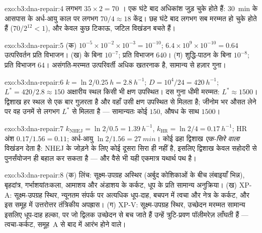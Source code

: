 \begin{solution}{exo:b3:dna-repair:4}
लगभग $35\times 2 = 70$ । एक घंटे बाद अधिकांश जुड़ चुके
होते हैं: \qty{30}{min} के आसपास के अर्ध-आयु काल पर लगभग $70/4 \approx 18$
केंद्र। छह घंटे बाद लगभग सब मरम्मत हो चुके होते हैं ($70/2^{12} < 1$),
और केवल कुछ टिकाऊ, जटिल विखंडन बचते हैं।
\end{solution}

\begin{solution}{exo:b3:dna-repair:5}
(क) $10^{-5}\times 10^{-2}\times 10^{-3} = 10^{-10}$; $6.4\times
10^{9}\times 10^{-10} = 0.64$ उत्परिवर्तन प्रति विभाजन। (ख)  के बिना $10^{-7}$; प्रति विभाजन $640$। (ग) शुद्धि-पाठन के बिना
$10^{-8}$; प्रति विभाजन $64$। असंगति-मरम्मत उत्परिवर्ती अधिक खतरनाक
है, सामान्य से हज़ार गुना।
\end{solution}

\begin{solution}{exo:b3:dna-repair:6}
$k = \ln 2/\qty{0.25}{h} = \qty{2.8}{h^{-1}}$; $D = 10^{4}/24 =
\qty{420}{h^{-1}}$; $L^{*} = 420/2.8 \approx 150$ अक्षारीय स्थल किसी भी
क्षण उपस्थित। दस गुना धीमी मरम्मत: $L^{*} \approx \num{1500}$।
द्विशाख हर स्थल से एक बार गुज़रता है और वहाँ उसी क्षण उपस्थित
 से मिलता है; जीनोम भर औसत लेने पर वह उनमें से लगभग $L^{*}$
से मिलता है --- सामान्यतः कोई $150$, औषध के साथ $\num{1500}$।
\end{solution}

\begin{solution}{exo:b3:dna-repair:7}
$k_{\text{NHEJ}} = \ln 2/0.5 = \qty{1.39}{h^{-1}}$, $k_{\text{HR}} =
\ln 2/4 = \qty{0.17}{h^{-1}}$; HR अंश $0.17/1.56 = 0.11$;
अर्ध-आयु $\ln 2/1.56 = \qty{27}{min}$। कोई ढहा द्विशाख
\emph{एक-सिरे वाला} विखंडन देता है: NHEJ के जोड़ने के लिए कोई दूसरा
सिरा ही नहीं है, इसलिए द्विशाख केवल सहोदरी से पुनर्संयोजन ही बहाल कर
सकता है --- और वैसे भी यही एकमात्र यथार्थ पथ है।
\end{solution}

\begin{solution}{exo:b3:dna-repair:8}
(क) लिंच: सूक्ष्म-उपग्रह अस्थिर (अर्बुद कोशिकाओं के बीच लंबाइयाँ भिन्न),
बृहदांत्र, गर्भाशयांतःकला, आमाशय और अंडाशय के कर्कट, धूप के प्रति
सामान्य अनुक्रिया। (ख) XP-A: सूक्ष्म-उपग्रह स्थिर, न्यूनतम संपर्क पर
अत्यधिक धूप-दाह, बचपन में त्वचा और नेत्र के कर्कट, और इस समूह में
उत्तरोत्तर तंत्रिकीय अपह्रास। (ग) XP-V: सूक्ष्म-उपग्रह स्थिर, उच्छेदन
मरम्मत सामान्य इसलिए धूप-दाह हल्का, पर जो द्विलक उच्छेदन से बच जाते
हैं उन्हें त्रुटि-प्रवण पॉलीमरेज़ लाँघती हैं --- त्वचा-कर्कट, समूह~A
से बाद में आरंभ होने वाले।
\end{solution}

